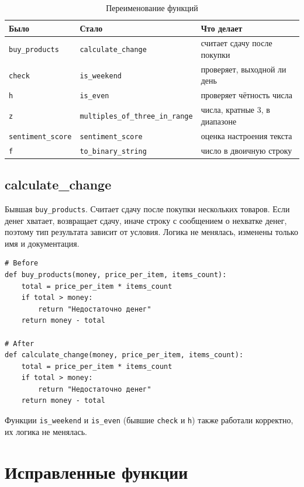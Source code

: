 \documentclass[a4paper,12pt]{article}
\begin{document}
\begin{table}[h]
\centering
\begin{tabular}{|l|l|p{5.5cm}|}
\hline
Было & Стало & Что делает \\ \hline
\texttt{buy\_products} & \texttt{calculate\_change} & считает сдачу после покупки \\ \hline
\texttt{check} & \texttt{is\_weekend} & проверяет, выходной ли день \\ \hline
\texttt{h} & \texttt{is\_even} & проверяет чётность числа \\ \hline
\texttt{z} & \texttt{multiples\_of\_three\_in\_range} & числа, кратные 3, в диапазоне \\ \hline
\texttt{sentiment\_score} & \texttt{sentiment\_score} & оценка настроения текста \\ \hline
\texttt{f} & \texttt{to\_binary\_string} & число в двоичную строку \\ \hline
\end{tabular}
\caption{Переименование функций}
\label{tab:functions}
\end{table}


\subsection{calculate\_change}

Бывшая \texttt{buy\_products}. Считает сдачу после покупки нескольких товаров. Если денег хватает, возвращает сдачу, иначе строку с сообщением о нехватке денег, поэтому тип результата зависит от условия. Логика не менялась, изменены только имя и документация.

\begin{lstlisting}
# Before
def buy_products(money, price_per_item, items_count):
    total = price_per_item * items_count
    if total > money:
        return "Недостаточно денег"
    return money - total

# After
def calculate_change(money, price_per_item, items_count):
    total = price_per_item * items_count
    if total > money:
        return "Недостаточно денег"
    return money - total
\end{lstlisting}

Функции \texttt{is\_weekend} и \texttt{is\_even} (бывшие \texttt{check} и \texttt{h}) также работали корректно, их логика не менялась.


\section{Исправленные функции}
\end{document}
